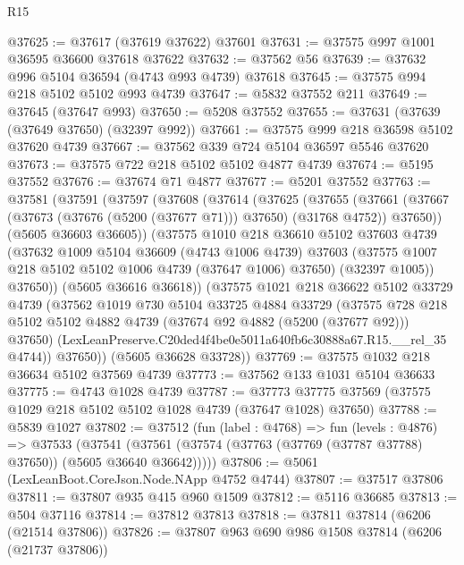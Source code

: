 \begin{lexlean}{R15}
\begin{coremodule}
{{{{{{{{{{{@37625 := @37617 (@37619 @37622) @37601
@37631 := @37575 @997 @1001 @36595 @36600 @37618 @37622
@37632 := @37562 @56
@37639 := @37632 @996 @5104 @36594 (@4743 @993 @4739) @37618
@37645 := @37575 @994 @218 @5102 @5102 @993 @4739
@37647 := @5832 @37552 @211
@37649 := @37645 (@37647 @993)
@37650 := @5208 @37552
@37655 := @37631 (@37639 (@37649 @37650) (@32397 @992))
@37661 := @37575 @999 @218 @36598 @5102 @37620 @4739
@37667 := @37562 @339 @724 @5104 @36597 @5546 @37620
@37673 := @37575 @722 @218 @5102 @5102 @4877 @4739
@37674 := @5195 @37552
@37676 := @37674 @71 @4877
@37677 := @5201 @37552
@37763 := @37581
    (@37591
      (@37597
        (@37608
          (@37614
            (@37625
              (@37655
                (@37661
                  (@37667 (@37673 (@37676 (@5200 (@37677 @71))) @37650) (@31768 @4752))
                  @37650))
              (@5605 @36603 @36605))
            (@37575
              @1010
              @218
              @36610
              @5102
              @37603
              @4739
              (@37632
                @1009
                @5104
                @36609
                (@4743 @1006 @4739)
                @37603
                (@37575 @1007 @218 @5102 @5102 @1006 @4739 (@37647 @1006) @37650)
                (@32397 @1005))
              @37650))
          (@5605 @36616 @36618))
        (@37575
          @1021
          @218
          @36622
          @5102
          @33729
          @4739
          (@37562
            @1019
            @730
            @5104
            @33725
            @4884
            @33729
            (@37575
              @728
              @218
              @5102
              @5102
              @4882
              @4739
              (@37674 @92 @4882 (@5200 (@37677 @92)))
              @37650)
            (LexLeanPreserve.C20ded4f4be0e5011a640fb6c30888a67.R15.__rel_35 @4744))
          @37650))
      (@5605 @36628 @33728))
@37769 := @37575 @1032 @218 @36634 @5102 @37569 @4739
@37773 := @37562 @133 @1031 @5104 @36633
@37775 := @4743 @1028 @4739
@37787 := @37773 @37775 @37569 (@37575 @1029 @218 @5102 @5102 @1028 @4739 (@37647 @1028) @37650)
@37788 := @5839 @1027
@37802 := @37512
    (fun (label : @4768) =>
    fun (levels : @4876) =>
    @37533
      (@37541 (@37561 (@37574 (@37763 (@37769 (@37787 @37788) @37650)) (@5605 @36640 @36642)))))
@37806 := @5061 (LexLeanBoot.CoreJson.Node.NApp @4752 @4744)
@37807 := @37517 @37806
@37811 := @37807 @935 @415 @960 @1509
@37812 := @5116 @36685
@37813 := @504 @37116
@37814 := @37812 @37813
@37818 := @37811 @37814 (@6206 (@21514 @37806))
@37826 := @37807 @963 @690 @986 @1508 @37814 (@6206 (@21737 @37806))
}}}}}}}}}}}
\end{coremodule}
\end{lexlean}
